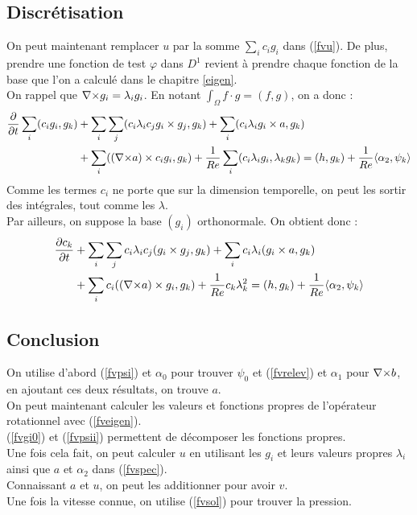 \subsection{Discrétisation}

On peut maintenant remplacer $u$ par la somme $\sum_ic_ig_i$ dans (\ref{fvu}). De plus, prendre une fonction de test $\varphi$ dans $D^1$ revient à prendre chaque fonction de la base que l'on a calculé dans le chapitre \ref{eigen}.\\
On rappel que ${\nabla\times} g_i=\lambda_ig_i$. En notant $\int_\Omega f\cdot g=(f,g)$, on a donc :
\begin{align*}
\frac{\partial}{\partial t}\sum_i (c_ig_i, g_k) &+ \sum_i\sum_j (c_i\lambda_ic_jg_i\times g_j,g_k) + \sum_i(c_i\lambda_ig_i\times a,g_k)\\
&+ \sum_i (({\nabla\times} a)\times c_ig_i,g_k) + \frac{1}{Re}\sum_i(c_i\lambda_ig_i, \lambda_kg_k) = (h,g_k) + \frac{1}{Re}\langle\alpha_2,\psi_k\rangle
\end{align*}
Comme les termes $c_i$ ne porte que sur la dimension temporelle, on peut les sortir des intégrales, tout comme les $\lambda$.\\
Par ailleurs, on suppose la base $(g_i)$ orthonormale. On obtient donc :
\begin{eqnarray}
\label{fvspec}
\begin{aligned}
\frac{\partial c_k}{\partial t} &+ \sum_i\sum_j c_i\lambda_i c_j(g_i\times g_j, g_k) + \sum_i c_i\lambda_i(g_i\times a,g_k)\\
&+ \sum_i c_i(({\nabla\times} a)\times g_i, g_k) + \frac{1}{Re}c_k\lambda_k^2 = (h,g_k) + \frac{1}{Re}\langle\alpha_2,\psi_k\rangle
\end{aligned}
\end{eqnarray}
 
\subsection{Conclusion}

On utilise d'abord (\ref{fvpsi}) et $\alpha_0$ pour trouver $\psi_0$ et (\ref{fvrelev}) et $\alpha_1$ pour ${\nabla\times} b$, en ajoutant ces deux résultats, on trouve $a$.\\
On peut maintenant calculer les valeurs et fonctions propres de l'opérateur rotationnel avec (\ref{fveigen}).\\
(\ref{fvgi0}) et (\ref{fvpsii}) permettent de décomposer les fonctions propres.\\
Une fois cela fait, on peut calculer $u$ en utilisant les $g_i$ et leurs valeurs propres $\lambda_i$ ainsi que $a$ et $\alpha_2$ dans (\ref{fvspec}).\\
Connaissant $a$ et $u$, on peut les additionner pour avoir $v$.\\
Une fois la vitesse connue, on utilise (\ref{fvsol}) pour trouver la pression. 

